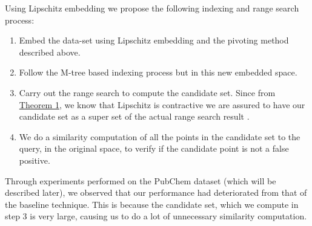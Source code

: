 Using Lipschitz embedding we propose the following indexing and range search process:\\
\begin{enumerate}
	\item Embed the data-set using Lipschitz embedding and the pivoting method described above.
	\item Follow the M-tree based indexing process but in this new embedded space.
	\item Carry out the range search to compute the candidate set.  Since from \hyperref[th0]{Theorem 1}, we know that Lipschitz is contractive we are assured to have our candidate set as a super set of the actual range search result .
	\item We do a similarity computation of all the points in the candidate set to the query, in the original space, to verify if the candidate point is not a false positive.
\end{enumerate}

Through experiments performed on the PubChem dataset (which will be described later), we observed that our performance had deteriorated from that of the baseline technique. This is because the candidate set, which we compute in step 3 is very large, causing us to do a lot of unnecessary similarity computation.
